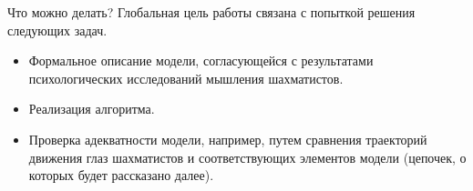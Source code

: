 \begin{frame}{Что можно делать?}
Глобальная цель работы связана с попыткой решения следующих задач.
\begin{itemize}
\item Формальное описание модели, согласующейся с результатами психологических исследований мышления шахматистов.
\item Реализация алгоритма.
\item Проверка адекватности модели, например, путем сравнения траекторий движения глаз шахматистов и соответствующих элементов модели (цепочек, о которых будет рассказано далее).
\end{itemize}
\end{frame}

\endinput

\begin{frame}{Зачем этим нужно заниматься?} 
\begin{itemize}
\item Шахматы, как игра с полной информацией, сводится к решению задачи комбинаторной оптимизации.
\item Человек способен эффективно решать подобные задачи неформальным способом.
\item Существующие игровые программы основываются на иных методах решения.
\item В точности определить подход, используемый человеком, на данный момент не удалось.
\end{itemize}
\end{frame}


\begin{frame}{Сравнение и почему ничего не подходит}
\begin{itemize}
\item  практические результаты достигнутые программами значительно превосходят человеческие. Обыграли человека во всех играх (в т.ч. Го)
\item Анализ большого количества данных (статистических или в ходе построения дерева)
\item Не учитываются психологические аспекты.
\item Отсутствует стратегическое дальносрочное планирование.
\item Процесс мышления человека смоделировать не удалось.
\end{itemize}
\end{frame} 
